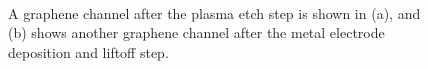 \documentclass[
  letterpaper,
  DIV=11,
  numbers=noendperiod]{scrartcl}
\begin{document}
\begin{figure}

\begin{minipage}[t]{0.47\linewidth}

{\centering 


}

\subcaption{\label{fig-graphene-channel-etch}}
\end{minipage}%
%
\begin{minipage}[t]{0.05\linewidth}

{\centering 

~

}

\end{minipage}%
%
\begin{minipage}[t]{0.47\linewidth}

{\centering 


}

\subcaption{\label{fig-graphene-channel-electrodes}}
\end{minipage}%

\caption{\label{fig-microscope-graphene-channel}A graphene channel after
the plasma etch step is shown in (a), and (b) shows another graphene
channel after the metal electrode deposition and liftoff step.}

\end{figure}
\end{document}
